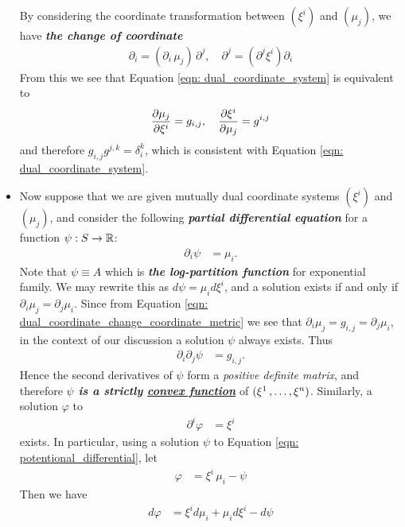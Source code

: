\documentclass[11pt]{article}
\begin{document}
\begin{itemize}
By considering the coordinate transformation between $(\xi^i)$ and $(\mu_j)$, we have \emph{\textbf{the change of coordinate}}
\begin{align*}
\partial_i = (\partial_i \,\mu_j)\,\partial^j, \quad \partial^j = (\partial^j \xi^i) \partial_i
\end{align*}
From this we see that Equation \eqref{eqn: dual_coordinate_system} is equivalent to
\begin{align}
\frac{\partial \mu_j}{ \partial \xi^i} = g_{i,j}, \quad \frac{\partial \xi^i}{ \partial \mu_j} = g^{i,j}  \label{eqn: dual_coordinate_change_coordinate_metric}
\end{align}
and therefore $g_{i,j}g^{j,k} = \delta_{i}^{k}$, which is consistent with Equation \eqref{eqn: dual_coordinate_system}.

\item Now suppose that we are given mutually dual coordinate systems $(\xi^i)$ and $(\mu_j)$, and consider the following \emph{\textbf{partial differential equation}} for a function $\psi: S \rightarrow {\mathbb R}$:
\begin{align}
\partial_i \psi &= \mu_i.  \label{eqn: potentional_differential}
\end{align} Note that $\psi \equiv A$ which is \emph{\textbf{the log-partition function}} for exponential family. We may rewrite this as $d\psi = \mu_i d\xi^i$, and a solution exists if and only if $\partial_i \mu_j= \partial_j \mu_i$. Since from Equation \eqref{eqn: dual_coordinate_change_coordinate_metric}  we see that $\partial_i \mu_j= g_{i,j} = \partial_j \mu_i$, in the context of our discussion a solution $\psi$  always exists. Thus
\begin{align}
\partial_i \partial_j \psi &= g_{i,j}. \label{eqn: potentional_2nd_differential}
\end{align}  Hence the second derivatives of  $\psi$ form a \emph{positive definite matrix}, and therefore \emph{\textbf{$\psi$ is a strictly \underline{convex function}}} of $(\xi^1 \,{,}\ldots{,}\, \xi^n)$. Similarly, a solution $\varphi$ to
\begin{align}
\partial^i \varphi &= \xi^i  \label{eqn: dual_potentional_differential}
\end{align} exists.  In particular, using a solution $\psi$ to Equation \eqref{eqn: potentional_differential}, let
\begin{align}
\varphi &= \xi^i\,\mu_i - \psi  \label{eqn: dual_transform}
\end{align} Then we have
\begin{align*}
 d\varphi &= \xi^i d\mu_i + \mu_i d\xi^i - d\psi\\

\end{align*}
\end{itemize}
\end{document}
